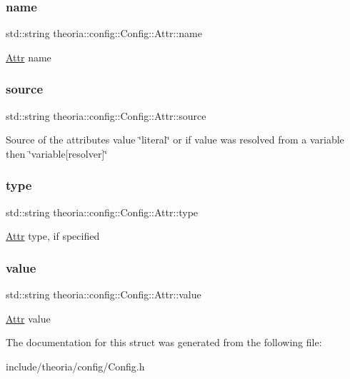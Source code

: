 \subsubsection{\texorpdfstring{name}{name}}
{\footnotesize\ttfamily std\+::string theoria\+::config\+::\+Config\+::\+Attr\+::name}

\hyperlink{structtheoria_1_1config_1_1Config_1_1Attr}{Attr} name \mbox{\label{structtheoria_1_1config_1_1Config_1_1Attr_aa2f90ed2b4db859ac6a83ec6b4d085e9}} 
\subsubsection{\texorpdfstring{source}{source}}
{\footnotesize\ttfamily std\+::string theoria\+::config\+::\+Config\+::\+Attr\+::source}

Source of the attributes value \char`\"{}literal\char`\"{} or if value was resolved from a variable then \char`\"{}variable\mbox{[}resolver\mbox{]}\char`\"{} \mbox{\label{structtheoria_1_1config_1_1Config_1_1Attr_a6bb657b1e985b583434f46a868f02908}} 
\subsubsection{\texorpdfstring{type}{type}}
{\footnotesize\ttfamily std\+::string theoria\+::config\+::\+Config\+::\+Attr\+::type}

\hyperlink{structtheoria_1_1config_1_1Config_1_1Attr}{Attr} type, if specified \mbox{\label{structtheoria_1_1config_1_1Config_1_1Attr_a089f492d8f4a5ca06879bef7dfc178f0}} 
\subsubsection{\texorpdfstring{value}{value}}
{\footnotesize\ttfamily std\+::string theoria\+::config\+::\+Config\+::\+Attr\+::value}

\hyperlink{structtheoria_1_1config_1_1Config_1_1Attr}{Attr} value 

The documentation for this struct was generated from the following file\+:\begin{DoxyCompactItemize}
\item 
include/theoria/config/Config.\+h\end{DoxyCompactItemize}
